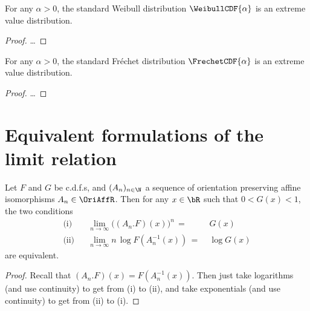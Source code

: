 \begin{theorem}
  \label{thm:Weibull-is-extr-val-distr}
  For any $\alpha > 0$, the standard Weibull distribution $\WeibullCDF{\alpha}$
  is an extreme value distribution.
\end{theorem}
\begin{proof}
  \ldots
\end{proof}

\begin{theorem}
  \label{thm:Frechet-is-extr-val-distr}
  For any $\alpha > 0$, the standard Fr\'echet distribution $\FrechetCDF{\alpha}$
  is an extreme value distribution.
\end{theorem}
\begin{proof}
  \uses{}
  \ldots
\end{proof}



\section{Equivalent formulations of the limit relation}

\begin{lemma}
  \label{lem:log-ev-limit}
  \leanok
  Let $F$ and $G$ be c.d.f.s, and $(A_n)_{n \in \N}$ a sequence of orientation
  preserving affine isomorphisms $A_n \in \OriAffR$. Then for any $x \in \bR$
  such that $0 < G(x) < 1$, the two conditions
  \begin{align*}
  \text{(i)} & & \lim_{n \to \infty} \big( (A_n.F)(x) \big)^n \, = \; & G(x) \\
  \text{(ii)} & & \lim_{n \to \infty} n \, \log F (A_n^{-1}(x)) \, = \; & \log G(x)
  \end{align*}
  are equivalent.
\end{lemma}
\begin{proof}
  \uses{}
  \leanok
  Recall that $(A_n.F)(x) = F (A_n^{-1}(x))$.
  Then just take logarithms (and use continuity) to get from (i) to (ii),
  and take exponentials (and use continuity) to get from (ii) to (i).
\end{proof}

